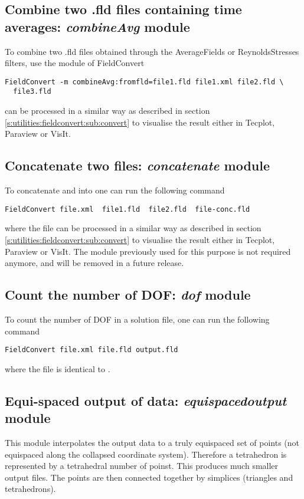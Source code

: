 \subsection{Combine two .fld files containing time averages: \textit{combineAvg} module}
To combine two .fld files obtained through the AverageFields or ReynoldsStresses filters,
use the  module of FieldConvert
%
\begin{lstlisting}[style=BashInputStyle]
  FieldConvert -m combineAvg:fromfld=file1.fld file1.xml file2.fld \
  file3.fld
\end{lstlisting}
%
 can be processed in a similar way as described
in section \ref{s:utilities:fieldconvert:sub:convert} to visualise
the result either in Tecplot, Paraview or VisIt.
%
%
%
\subsection{Concatenate two files: \textit{concatenate} module}
To concatenate  and  into 
one can run the following command
%
\begin{lstlisting}[style=BashInputStyle]
FieldConvert file.xml  file1.fld  file2.fld  file-conc.fld
\end{lstlisting}
%
where the file  can be processed in a similar
way as described in section \ref{s:utilities:fieldconvert:sub:convert}
to visualise the result either in Tecplot, Paraview or VisIt. The
\inltt{concatenate} module previously used for this purpose is not
required anymore, and will be removed in a future release.
%
%
%
\subsection{Count the number of DOF: \textit{dof} module}
To count the number of DOF in a solution file,
one can run the following command
%
\begin{lstlisting}[style=BashInputStyle]
FieldConvert file.xml file.fld output.fld
\end{lstlisting}
%
where the file  is identical to .
%
%
%
\subsection{Equi-spaced output of data: \textit{equispacedoutput} module}
This module interpolates the output data to a truly equispaced set of
points (not equispaced along the collapsed coordinate
system). Therefore a tetrahedron is represented by a tetrahedral
number of poinst. This produces much smaller output files. The points
are then connected together by simplices (triangles and tetrahedrons).

